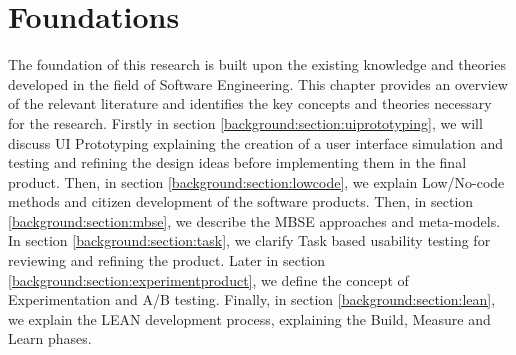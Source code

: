 
\chapter{Foundations} 
\ifpdf
    \graphicspath{{Chapters/Background/Figs/}{Chapters/Background/Figs/}{Chapters/Background/Figs/}}
\else
    \graphicspath{{Chapters/Background/Figs/}{Chapters/Background/Figs/}}
\fi
The foundation of this research is built upon the existing knowledge and theories developed in the field of Software Engineering.
This chapter provides an overview of the relevant literature and identifies the key concepts and theories necessary for the research. 
Firstly in section \ref{background:section:uiprototyping}, we will discuss UI Prototyping explaining the creation of a user interface simulation and testing and refining the design ideas before implementing them in the final product.
Then, in section \ref{background:section:lowcode}, we explain Low/No-code methods and citizen development of the software products. 
Then, in section \ref{background:section:mbse}, we describe the MBSE approaches and meta-models.
In section \ref{background:section:task}, we clarify Task based usability testing for reviewing and refining the product. 
Later in section \ref{background:section:experimentproduct}, we define the concept of Experimentation and A/B testing. 
Finally, in section \ref{background:section:lean}, we explain the LEAN development process, explaining the Build, Measure and Learn phases.

